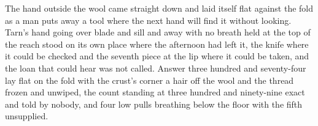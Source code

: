The hand outside the wool came straight down and laid itself flat against the fold as a man puts away a tool where the next hand will find it without looking. Tarn's hand going over blade and sill and away with no breath held at the top of the reach stood on its own place where the afternoon had left it, the knife where it could be checked and the seventh piece at the lip where it could be taken, and the loan that could hear was not called. Answer three hundred and seventy-four lay flat on the fold with the crust's corner a hair off the wool and the thread frozen and unwiped, the count standing at three hundred and ninety-nine exact and told by nobody, and four low pulls breathing below the floor with the fifth unsupplied.
